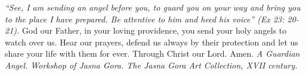 \pagestyle{empty}
\hspace{0pt}
\vfill

\textit{``See, I am sending an angel before you, to guard you on
your way and bring you to the place I have prepared. Be attentive
to him and heed his voice'' (Ex 23: 20-21).}
\medbreak
God our Father, in your loving providence, you send your
holy angels to watch over us. Hear our prayers, defend us always
by their protection and let us share your life with them for ever.
Through Christ our Lord. Amen.
\vfill
\textit{A Guardian Angel. Workshop of Jasna Gora. The Jasna Gora Art
Collection, XVII century.}
\hspace{0pt}
\newpage
